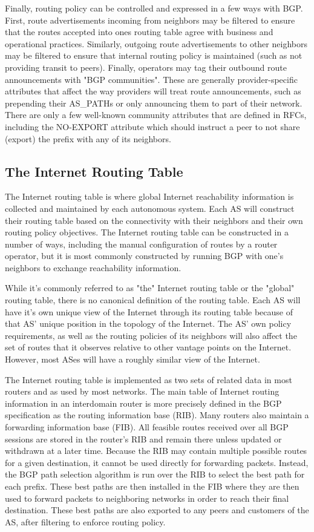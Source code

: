 Finally, routing policy can be controlled and expressed in a few ways with BGP. First, route advertisements incoming from neighbors may be filtered to ensure that the routes accepted into ones routing table agree with business and operational practices. Similarly, outgoing route advertisements to other neighbors may be filtered to ensure that internal routing policy is maintained (such as not providing transit to peers). Finally, operators may tag their outbound route announcements with "BGP communities". These are generally provider-specific attributes that affect the way providers will treat route announcements, such as prepending their AS\_PATHs or only announcing them to part of their network. There are only a few well-known community attributes that are defined in RFCs, including the NO-EXPORT attribute which should instruct a peer to not share (export) the prefix with any of its neighbors.

\subsection{The Internet Routing Table}

The Internet routing table is where global Internet reachability information is collected and maintained by each autonomous system. Each AS will construct their routing table based on the connectivity with their neighbors and their own routing policy objectives. The Internet routing table can be constructed in a number of ways, including the manual configuration of routes by a router operator, but it is most commonly constructed by running BGP with one's neighbors to exchange reachability information.

While it's commonly referred to as "the" Internet routing table or the "global" routing table, there is no canonical definition of the routing table. Each AS will have it's own unique view of the Internet through its routing table because of that AS' unique position in the topology of the Internet. The AS' own policy requirements, as well as the routing policies of its neighbors will also affect the set of routes that it observes relative to other vantage points on the Internet. However, most ASes will have a roughly similar view of the Internet.

The Internet routing table is implemented as two sets of related data in most routers and as used by most networks. The main table of Internet routing information in an interdomain router is more precisely defined in the BGP specification \cite{rfc4271} as the routing information base (RIB). Many routers also maintain a forwarding information base (FIB). All feasible routes received over all BGP sessions are stored in the router's RIB and remain there unless updated or withdrawn at a later time. Because the RIB may contain multiple possible routes for a given destination, it cannot be used directly for forwarding packets. Instead, the BGP path selection algorithm is run over the RIB to select the best path for each prefix. These best paths are then installed in the FIB where they are then used to forward packets to neighboring networks in order to reach their final destination. These best paths are also exported to any peers and customers of the AS, after filtering to enforce routing policy.

